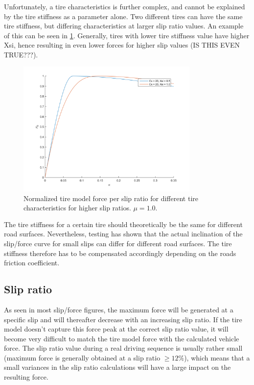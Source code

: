 Unfortunately, a tire characteristics is further complex, and cannot be explained by the tire stiffness as a parameter alone. Two different tires can have the same tire stiffness, but differing characteristics at larger slip ratio values. An example of this can be seen in \ref{different_xsi}. Generally, tires with lower tire stiffness value have higher Xsi, hence resulting in even lower forces for higher slip values (IS THIS EVEN TRUE???). 

\begin{figure}[h]
	\centering
	\includegraphics[width=0.8\textwidth]{Pictures/slipkraft_olika_xsi}
	\caption {Normalized tire model force per slip ratio for different tire characteristics for higher slip ratios.  $ \mu = 1.0 $.}
	\label{different_xsi}
\end{figure}

The tire stiffness for a certain tire should theoretically be the same for different road surfaces. Nevertheless, testing has shown that the actual inclination of the slip/force curve for small slips can differ for different road surfaces. The tire stiffness therefore has to be compensated accordingly depending on the roads friction coefficient.

\subsection{Slip ratio}

As seen in most slip/force figures, the maximum force will be generated at a specific slip and will thereafter decrease with an increasing slip ratio. If the tire model doesn't capture this force peak at the correct slip ratio value, it will become very difficult to match the tire model force with the calculated vehicle force. The slip ratio value during a real driving sequence is usually rather small (maximum force is generally obtained at a slip ratio $ \geq 12 \% $), which means that a small variances in the slip ratio calculations will have a large impact on the resulting force.

